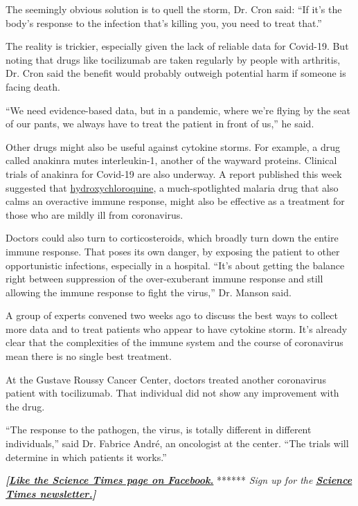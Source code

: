 The seemingly obvious solution is to quell the storm, Dr. Cron said:
``If it's the body's response to the infection that's killing you, you
need to treat that.''

The reality is trickier, especially given the lack of reliable data for
Covid-19. But noting that drugs like tocilizumab are taken regularly by
people with arthritis, Dr. Cron said the benefit would probably outweigh
potential harm if someone is facing death.

``We need evidence-based data, but in a pandemic, where we're flying by
the seat of our pants, we always have to treat the patient in front of
us,'' he said.

Other drugs might also be useful against cytokine storms. For example, a
drug called anakinra mutes interleukin-1, another of the wayward
proteins. Clinical trials of anakinra for Covid-19 are also underway. A
report published this week suggested that
\href{https://www.nytimes.com/2020/04/01/health/hydroxychloroquine-coronavirus-malaria.html}{hydroxychloroquine},
a much-spotlighted malaria drug that also calms an overactive immune
response, might also be effective as a treatment for those who are
mildly ill from coronavirus.

Doctors could also turn to corticosteroids, which broadly turn down the
entire immune response. That poses its own danger, by exposing the
patient to other opportunistic infections, especially in a hospital.
``It's about getting the balance right between suppression of the
over-exuberant immune response and still allowing the immune response to
fight the virus,'' Dr. Manson said.

A group of experts convened two weeks ago to discuss the best ways to
collect more data and to treat patients who appear to have cytokine
storm. It's already clear that the complexities of the immune system and
the course of coronavirus mean there is no single best treatment.

At the Gustave Roussy Cancer Center, doctors treated another coronavirus
patient with tocilizumab. That individual did not show any improvement
with the drug.

``The response to the pathogen, the virus, is totally different in
different individuals,'' said Dr. Fabrice André, an oncologist at the
center. ``The trials will determine in which patients it works.''

\textbf{\emph{{[}}\href{http://on.fb.me/1paTQ1h}{\emph{Like the Science
Times page on Facebook.}}} ****** \emph{\textbar{} Sign up for the}
\textbf{\href{http://nyti.ms/1MbHaRU}{\emph{Science Times
newsletter.}}\emph{{]}}}

